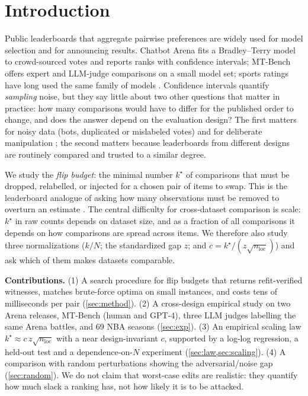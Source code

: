 \documentclass{article}
\theoremstyle{plain}
\theoremstyle{remark}
\newcommand{\nloc}{n_{\mathrm{loc}}}
\newcommand{\kstar}{k^\star}
\begin{document}
\section{Introduction}
Public leaderboards that aggregate pairwise preferences are widely used for model selection and for announcing results. Chatbot Arena \citep{chiang2024} fits a Bradley--Terry model \citep{bradley1952} to crowd-sourced votes and reports ranks with confidence intervals; MT-Bench \citep{zheng2023} offers expert and LLM-judge comparisons on a small model set; sports ratings have long used the same family of models \citep{elo1978}. Confidence intervals quantify \emph{sampling} noise, but they say little about two other questions that matter in practice: how many comparisons would have to differ for the published order to change, and does the answer depend on the evaluation design? The first matters for noisy data (bots, duplicated or mislabeled votes) and for deliberate manipulation \citep{min2025}; the second matters because leaderboards from different designs are routinely compared and trusted to a similar degree.

We study the \emph{flip budget}: the minimal number $\kstar$ of comparisons that must be dropped, relabelled, or injected for a chosen pair of items to swap. This is the leaderboard analogue of asking how many observations must be removed to overturn an estimate \citep{broderick2020}. The central difficulty for cross-dataset comparison is scale: $\kstar$ in raw counts depends on dataset size, and as a fraction of all comparisons it depends on how comparisons are spread across items. We therefore also study three normalizations ($k/N$; the standardized gap $z$; and $c=\kstar/(z\sqrt{\nloc})$) and ask which of them makes datasets comparable.

\textbf{Contributions.} (1) A search procedure for flip budgets that returns refit-verified witnesses, matches brute-force optima on small instances, and costs tens of milliseconds per pair (\cref{sec:method}). (2) A cross-design empirical study on two Arena releases, MT-Bench (human and GPT-4), three LLM judges labelling the same Arena battles, and 69 NBA seasons (\cref{sec:exp}). (3) An empirical scaling law $\kstar\approx c\,z\sqrt{\nloc}$ with a near design-invariant $c$, supported by a log-log regression, a held-out test and a dependence-on-$N$ experiment (\cref{sec:law,sec:scaling}). (4) A comparison with random perturbations showing the adversarial/noise gap (\cref{sec:random}). We do not claim that worst-case edits are realistic: they quantify how much slack a ranking has, not how likely it is to be attacked.
\end{document}
